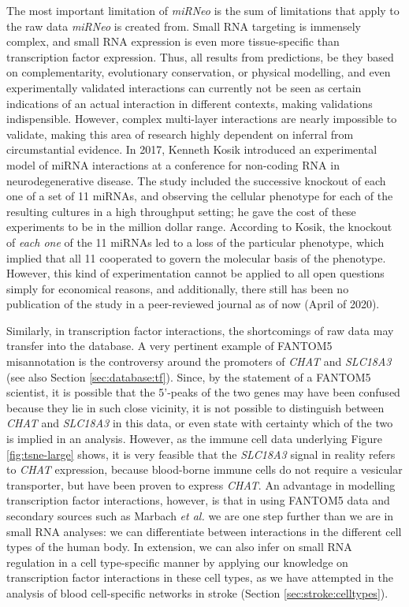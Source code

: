 The most important limitation of \emph{miRNeo} is the sum of limitations that apply to the raw data \emph{miRNeo} is created from. Small RNA targeting is immensely complex, and small RNA expression is even more tissue-specific than transcription factor expression.\cite{Nowakowski2018} Thus, all results from predictions, be they based on complementarity, evolutionary conservation, or physical modelling, and even experimentally validated interactions can currently not be seen as certain indications of an actual interaction in different contexts, making validations indispensible. However, complex multi-layer interactions are nearly impossible to validate, making this area of research highly dependent on inferral from circumstantial evidence. In 2017, Kenneth Kosik introduced an experimental model of miRNA interactions at a conference for non-coding RNA in neurodegenerative disease.\cite{Kosik2017p} The study included the successive knockout of each one of a set of 11 miRNAs, and observing the cellular phenotype for each of the resulting cultures in a high throughput setting; he gave the cost of these experiments to be in the million dollar range. According to Kosik, the knockout of \emph{each one} of the 11 miRNAs led to a loss of the particular phenotype, which implied that all 11 cooperated to govern the molecular basis of the phenotype. However, this kind of experimentation cannot be applied to all open questions simply for economical reasons, and additionally, there still has been no publication of the study in a peer-reviewed journal as of now (April of 2020).\cite{Kosik2020w}

Similarly, in transcription factor interactions, the shortcomings of raw data may transfer into the database. A very pertinent example of FANTOM5 misannotation is the controversy around the promoters of \emph{CHAT} and \emph{SLC18A3} (see also Section \ref{sec:database:tf}). Since, by the statement of a FANTOM5 scientist, it is possible that the 5'-peaks of the two genes may have been confused because they lie in such close vicinity, it is not possible to distinguish between \emph{CHAT} and \emph{SLC18A3} in this data, or even state with certainty which of the two is implied in an analysis. However, as the immune cell data underlying Figure \ref{fig:tsne-large} shows, it is very feasible that the \emph{SLC18A3} signal in reality refers to \emph{CHAT} expression, because blood-borne immune cells do not require a vesicular transporter, but have been proven to express \emph{CHAT}. An advantage in modelling transcription factor interactions, however, is that in using FANTOM5 data and secondary sources such as Marbach \emph{et al.}\cite{Marbach2016} we are one step further than we are in small RNA analyses: we can differentiate between interactions in the different cell types of the human body. In extension, we can also infer on small RNA regulation in a cell type-specific manner by applying our knowledge on transcription factor interactions in these cell types, as we have attempted in the analysis of blood cell-specific networks in stroke (Section \ref{sec:stroke:celltypes}).

